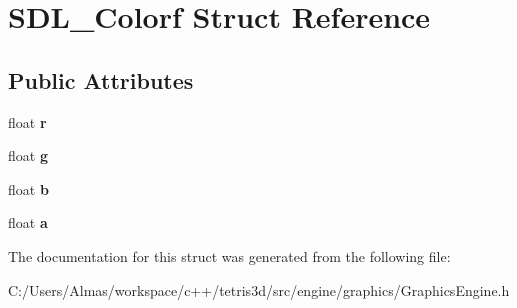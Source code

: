 \hypertarget{struct_s_d_l___colorf}{\section{S\-D\-L\-\_\-\-Colorf Struct Reference}
\label{struct_s_d_l___colorf}
}
\subsection*{Public Attributes}
\begin{DoxyCompactItemize}
\item 
\hypertarget{struct_s_d_l___colorf_a51a53e93c972427a903a0277d8e701ef}{float {\bfseries r}}\label{struct_s_d_l___colorf_a51a53e93c972427a903a0277d8e701ef}

\item 
\hypertarget{struct_s_d_l___colorf_ac7d2900c4a38db70c8a27aa581cc05bb}{float {\bfseries g}}\label{struct_s_d_l___colorf_ac7d2900c4a38db70c8a27aa581cc05bb}

\item 
\hypertarget{struct_s_d_l___colorf_aa3cc486c55a413fd3af19ca8a5144773}{float {\bfseries b}}\label{struct_s_d_l___colorf_aa3cc486c55a413fd3af19ca8a5144773}

\item 
\hypertarget{struct_s_d_l___colorf_a8a541954422f06610aec4d0f34a17d07}{float {\bfseries a}}\label{struct_s_d_l___colorf_a8a541954422f06610aec4d0f34a17d07}

\end{DoxyCompactItemize}


The documentation for this struct was generated from the following file\-:\begin{DoxyCompactItemize}
\item 
C\-:/\-Users/\-Almas/workspace/c++/tetris3d/src/engine/graphics/Graphics\-Engine.\-h\end{DoxyCompactItemize}
